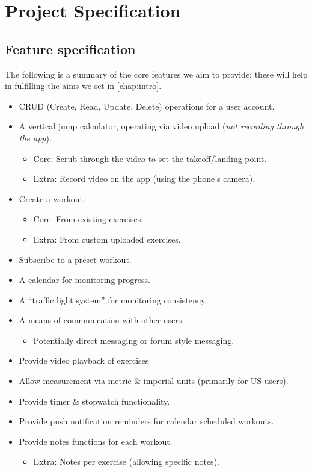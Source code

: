 \chapter{Project Specification}
\label{chap:project-specification}
\vspace{-10mm}
\section{Feature specification}
\label{sec:features}
The following is a summary of the core features we aim to provide; these will help in 
fulfilling the aims we set in \cref{chap:intro}.
\begin{itemize}[noitemsep]
    \item CRUD (Create, Read, Update, Delete) operations for a user account.
    \item A vertical jump calculator, operating via video upload (\textit{not recording through the app}).
    \begin{itemize}[nolistsep,noitemsep]
        \item Core: Scrub through the video to set the takeoff/landing point.
        \item Extra: Record video on the app (using the phone's camera).
    \end{itemize}
    \item Create a workout.
    \begin{itemize}[nolistsep,noitemsep]
        \item Core: From existing exercises.
        \item Extra: From custom uploaded exercises.
    \end{itemize} 
    \item Subscribe to a preset workout.
    \item A calendar for monitoring progress.
    \item A ``traffic light system'' for monitoring consistency.
    \item A means of communication with other users.
    \begin{itemize}[nolistsep,noitemsep]
        \item Potentially direct messaging or forum style messaging.
    \end{itemize}
    \item Provide video playback of exercises
    \item Allow measurement via metric \& imperial units (primarily for US users).
    \item Provide timer \& stopwatch functionality.
    \item Provide push notification reminders for calendar scheduled workouts.
    \item Provide notes functions for each workout.
    \begin{itemize}[nolistsep,noitemsep]
        \item Extra: Notes per exercise (allowing specific notes).
    \end{itemize}
\end{itemize}
\pagebreak


